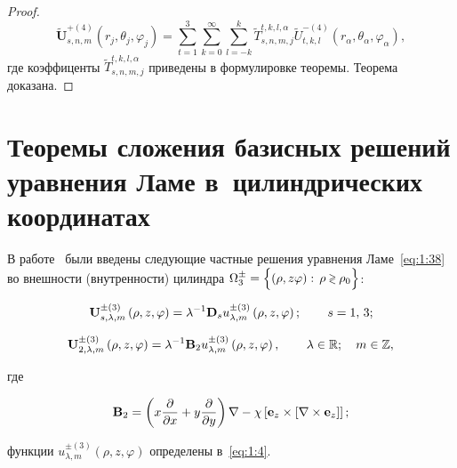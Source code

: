 \begin{russian}
\begin{proof}
\begin{equation}
\mathbf{\tilde U}_{s,n,m}^{+(4)}(r_j,\theta_j,\varphi_j)=\sum\limits_{t=1}^3\sum\limits_{k=0}^\infty\sum\limits_{l=-k}^k\tilde T_{s,n,m,j}^{t,k,l,\alpha}\tilde U_{t,k,l}^{-(4)}(r_\alpha,\theta_\alpha,\varphi_\alpha),
\label{eq:1:122r}
\end{equation}
где коэффиценты $\tilde T_{s,n,m,j}^{t,k,l,\alpha}$ приведены в формулировке теоремы. Теорема доказана.
\end{proof}


\section[Теоремы сложения базисных решений уравнения Ламе в цилиндрических координатах]{Теоремы сложения базисных решений уравнения Ламе в~цилиндрических координатах}

В работе~\cite{Nikolaev1993} были введены следующие частные решения уравнения Ламе~\eqref{eq:1:38} во внешности (внутренности) цилиндра $\Omega _3^ \pm  = \Big\{ {\left( {\rho ,z\varphi } \right):{\mkern 1mu} {\kern 1pt} \rho  \mathbin{\lower.3ex\hbox{$\buildrel>\over
{\smash{\scriptstyle<}\vphantom{_x}}$}} {\rho _0}} \Big\}$:

\begin{equation}\label{eq:1:103}
{\bf{U}}_{s,\lambda ,m}^{ \pm (3)}\left( {\rho ,z,\varphi } \right) = {\lambda ^{ - 1}}{{\bf{D}}_s}u_{\lambda ,m}^{ \pm (3)}\left( {\rho ,z,\varphi } \right);\qquad {\kern 1pt} s = 1,{\mkern 1mu} {\kern 1pt} 3;
\end{equation}

\begin{equation}\label{eq:1:104}
{\bf{U}}_{2,\lambda ,m}^{ \pm (3)}\left( {\rho ,z,\varphi } \right) = {\lambda ^{ - 1}}{{\bf{B}}_2}u_{\lambda ,m}^{ \pm (3)}\left( {\rho ,z,\varphi } \right),\qquad {\kern 1pt} \lambda  \in\mathbb{R};\quad m \in\mathbb{Z},
\end{equation}

\noindent где

\begin{equation}\label{eq:1:105}
{{\bf{B}}_2} = \left( {x\frac{\partial }{{\partial x}} + y\frac{\partial }{{\partial y}}} \right)\nabla  - \chi \left[ {{{\bf{e}}_z} \times \left[ {\nabla  \times {{\bf{e}}_z}} \right]} \right];
\end{equation}

\noindent функции $u_{\lambda ,m}^{ \pm (3)}\left( {\rho ,z,\varphi } \right)$ определены в~\eqref{eq:1:4}.


\end{russian}
